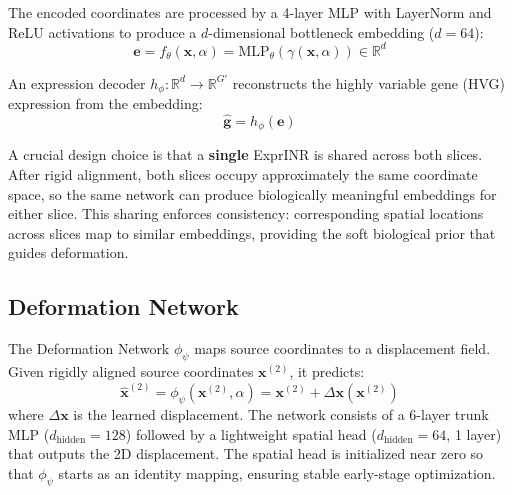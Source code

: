 \documentclass[runningheads]{llncs}
\begin{document}
The encoded coordinates are processed by a 4-layer MLP with LayerNorm and ReLU activations to produce a $d$-dimensional bottleneck embedding ($d=64$):
\begin{equation}
\mathbf{e} = f_\theta(\mathbf{x}, \alpha) = \text{MLP}_\theta(\gamma(\mathbf{x}, \alpha)) \in \mathbb{R}^d
\end{equation}

An expression decoder $h_\phi: \mathbb{R}^d \rightarrow \mathbb{R}^{G'}$ reconstructs the highly variable gene (HVG) expression from the embedding:
\begin{equation}
\hat{\mathbf{g}} = h_\phi(\mathbf{e})
\end{equation}

A crucial design choice is that a \textbf{single} ExprINR is shared across both slices. After rigid alignment, both slices occupy approximately the same coordinate space, so the same network can produce biologically meaningful embeddings for either slice. This sharing enforces consistency: corresponding spatial locations across slices map to similar embeddings, providing the soft biological prior that guides deformation.


\subsection{Deformation Network}

The Deformation Network $\phi_\psi$ maps source coordinates to a displacement field. Given rigidly aligned source coordinates $\mathbf{x}^{(2)}$, it predicts:
\begin{equation}
\hat{\mathbf{x}}^{(2)} = \phi_\psi(\mathbf{x}^{(2)}, \alpha) = \mathbf{x}^{(2)} + \Delta\mathbf{x}(\mathbf{x}^{(2)})
\end{equation}
where $\Delta\mathbf{x}$ is the learned displacement. The network consists of a 6-layer trunk MLP ($d_{\text{hidden}}=128$) followed by a lightweight spatial head ($d_{\text{hidden}}=64$, 1 layer) that outputs the 2D displacement. The spatial head is initialized near zero so that $\phi_\psi$ starts as an identity mapping, ensuring stable early-stage optimization.
\end{document}
